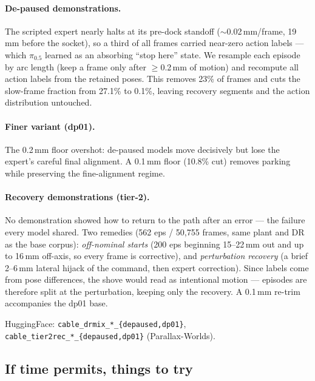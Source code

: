 \paragraph{De-paused demonstrations.}
The scripted expert nearly halts at its pre-dock standoff ($\sim$0.02\,mm/frame,
19\,mm before the socket), so a third of all frames carried near-zero action labels
--- which $\pi_{0.5}$ learned as an absorbing ``stop here'' state. We resample each
episode by arc length (keep a frame only after $\geq$0.2\,mm of motion) and recompute
all action labels from the retained poses. This removes 23\% of frames and cuts the
slow-frame fraction from 27.1\% to 0.1\%, leaving recovery segments and the action
distribution untouched.

\paragraph{Finer variant (dp01).}
The 0.2\,mm floor overshot: de-paused models move decisively but lose the expert's
careful final alignment. A 0.1\,mm floor (10.8\% cut) removes parking while
preserving the fine-alignment regime.

\paragraph{Recovery demonstrations (tier-2).}
No demonstration showed how to return to the path after an error --- the failure every
model shared. Two remedies (562 eps / 50{,}755 frames, same plant and DR as the base
corpus): \emph{off-nominal starts} (200 eps beginning 15--22\,mm out and up to
16\,mm off-axis, so every frame is corrective), and \emph{perturbation recovery}
(a brief 2--6\,mm lateral hijack of the command, then expert correction). Since labels
come from pose differences, the shove would read as intentional motion --- episodes
are therefore split at the perturbation, keeping only the recovery. A 0.1\,mm re-trim
accompanies the dp01 base.

\footnotesize{HuggingFace: \texttt{cable\_drmix\_*\_\{depaused,dp01\}},
\texttt{cable\_tier2rec\_*\_\{depaused,dp01\}} (Parallax-Worlds).}

\subsection*{\color{cmured} If time permits, things to try}


